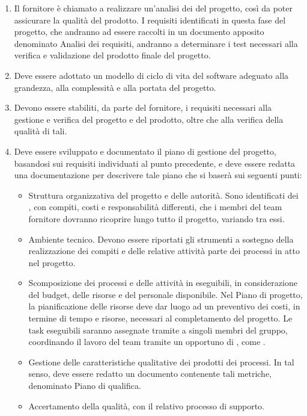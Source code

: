 \begin{enumerate}
    \item Il fornitore è chiamato a realizzare un'analisi dei  del progetto, così da poter assicurare la qualità del prodotto. I requisiti identificati in questa fase del progetto, che andranno ad essere raccolti in un documento apposito denominato Analisi dei requisiti, andranno a determinare i test necessari alla verifica e validazione del prodotto finale del progetto.
    \item Deve essere adottato un modello di ciclo di vita del software adeguato alla grandezza, alla complessità e alla portata del progetto.
    \item Devono essere stabiliti, da parte del fornitore, i requisiti necessari alla gestione e verifica del progetto e del prodotto, oltre che alla verifica della qualità di tali.
    \item Deve essere sviluppato e documentato il piano di gestione del progetto, basandosi sui requisiti individuati al punto precedente, e deve essere redatta una documentazione per descrivere tale piano che si baserà sui seguenti punti:
    \begin{itemize}
        \item Struttura organizzativa del progetto e delle autorità. Sono identificati dei , con compiti, costi e responsabilità differenti, che i membri del team fornitore dovranno ricoprire lungo tutto il progetto, variando tra essi.
        \item Ambiente tecnico. Devono essere riportati gli strumenti a sostegno della realizzazione dei compiti e delle relative attività parte dei processi in atto nel progetto.
        \item Scomposizione dei processi e delle attività in  eseguibili, in considerazione del budget, delle risorse e del personale disponibile. Nel Piano di progetto, la pianificazione delle risorse deve dar luogo ad un preventivo dei costi, in termine di tempo e risorse, necessari al completamento del progetto. Le task eseguibili saranno assegnate tramite  a singoli membri del gruppo, coordinando il lavoro del team tramite un opportuno  di , come .
        \item Gestione delle caratteristiche qualitative dei prodotti dei processi. In tal senso, deve essere redatto un documento contenente tali metriche, denominato Piano di qualifica.
        \item Accertamento della qualità, con il relativo processo di supporto.

\end{itemize}
\end{enumerate}

